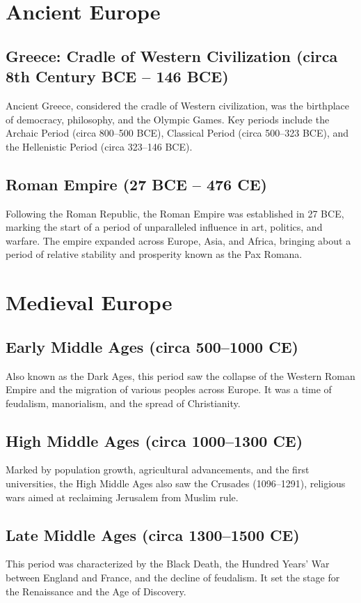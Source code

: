 \documentclass[a4paper,12pt]{book}
\begin{document}
\section{Ancient Europe}
\label{sec:ancient-europe}
\subsection{Greece: Cradle of Western Civilization (circa 8th Century BCE – 146 BCE)}
Ancient Greece, considered the cradle of Western civilization, was the birthplace of democracy, philosophy, and the Olympic Games. Key periods include the Archaic Period (circa 800–500 BCE), Classical Period (circa 500–323 BCE), and the Hellenistic Period (circa 323–146 BCE).

\subsection{Roman Empire (27 BCE – 476 CE)}
Following the Roman Republic, the Roman Empire was established in 27 BCE, marking the start of a period of unparalleled influence in art, politics, and warfare. The empire expanded across Europe, Asia, and Africa, bringing about a period of relative stability and prosperity known as the Pax Romana.

\section{Medieval Europe}
\label{sec:medieval-europe}
\subsection{Early Middle Ages (circa 500–1000 CE)}
Also known as the Dark Ages, this period saw the collapse of the Western Roman Empire and the migration of various peoples across Europe. It was a time of feudalism, manorialism, and the spread of Christianity.

\subsection{High Middle Ages (circa 1000–1300 CE)}
Marked by population growth, agricultural advancements, and the first universities, the High Middle Ages also saw the Crusades (1096–1291), religious wars aimed at reclaiming Jerusalem from Muslim rule.

\subsection{Late Middle Ages (circa 1300–1500 CE)}
This period was characterized by the Black Death, the Hundred Years' War between England and France, and the decline of feudalism. It set the stage for the Renaissance and the Age of Discovery.
\end{document}
